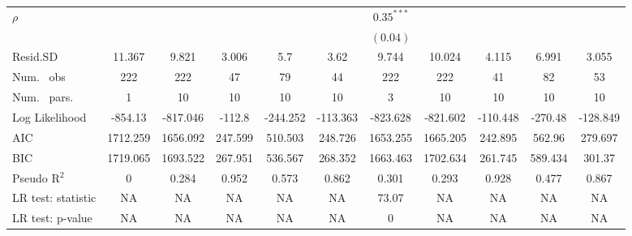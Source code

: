 \begin{table}
\begin{center}
\begin{tabular}{l c c c c c c c c c c}
$\rho$                            &               &               &               &                &                & $0.35^{***}$  &               &               &               &                \\
                                  &               &               &               &                &                & $(0.04)$      &               &               &               &                \\
\hline
Resid.SD                          & 11.367        & 9.821         & 3.006         & 5.7            & 3.62           & 9.744         & 10.024        & 4.115         & 6.991         & 3.055          \\
Num. \ obs                        & 222           & 222           & 47            & 79             & 44             & 222           & 222           & 41            & 82            & 53             \\
Num. \ pars.                      & 1             & 10            & 10            & 10             & 10             & 3             & 10            & 10            & 10            & 10             \\
Log Likelihood                    & -854.13       & -817.046      & -112.8        & -244.252       & -113.363       & -823.628      & -821.602      & -110.448      & -270.48       & -128.849       \\
AIC                               & 1712.259      & 1656.092      & 247.599       & 510.503        & 248.726        & 1653.255      & 1665.205      & 242.895       & 562.96        & 279.697        \\
BIC                               & 1719.065      & 1693.522      & 267.951       & 536.567        & 268.352        & 1663.463      & 1702.634      & 261.745       & 589.434       & 301.37         \\
Pseudo R$^2$                      & 0             & 0.284         & 0.952         & 0.573          & 0.862          & 0.301         & 0.293         & 0.928         & 0.477         & 0.867          \\
LR test: statistic                & NA            & NA            & NA            & NA             & NA             & 73.07         & NA            & NA            & NA            & NA             \\
LR test: p-value                  & NA            & NA            & NA            & NA             & NA             & 0             & NA            & NA            & NA            & NA             \\

\end{tabular}
\end{center}
\end{table}
